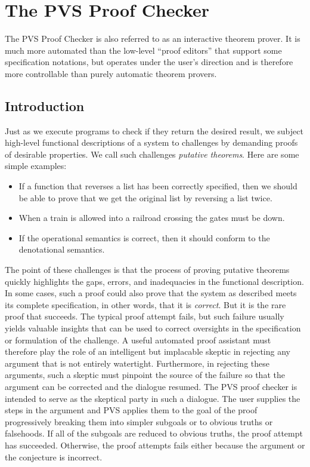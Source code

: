 
\section{The PVS Proof Checker}

The PVS Proof Checker is also referred to as an interactive theorem
prover.  It is much more automated than the low-level ``proof
editors'' that support some specification notations, but operates
under the user's direction and is therefore more controllable than
purely automatic theorem provers.


\subsection{Introduction}

Just as we execute programs to check if they return the desired result,
we subject high-level functional descriptions of a system to challenges
by demanding proofs of desirable properties.  We call such challenges
{\em putative theorems}.  Here are some simple examples:
\begin{itemize}
  \item If a function that reverses a list has been
correctly specified, then we should be able to prove that we get the
original list by reversing a list twice.

  \item When a train is allowed into a railroad crossing the gates must
be down.  

  \item If the operational semantics is correct, then it should conform
to the denotational semantics.
\end{itemize}
%
The point of these challenges is that the process of proving putative
theorems quickly highlights the gaps, errors, and inadequacies in the
functional description.  In some cases, such a proof could also prove
that the system as described meets its complete specification, in other
words, that it is {\em correct\/}.  But it is the rare proof that
succeeds.  The typical proof attempt fails, but such failure usually
yields valuable insights that can be used to correct oversights in the
specification or formulation of the challenge.  A useful automated proof
assistant must therefore play the role of an intelligent but implacable
skeptic in rejecting any argument that is not entirely watertight.
Furthermore, in rejecting these arguments, such a skeptic must pinpoint
the source of the failure so that the argument can be corrected and the
dialogue resumed.  The PVS proof checker is intended to serve as the
skeptical party in such a dialogue.  The user supplies the steps in the
argument and PVS applies them to the goal of the proof progressively
breaking them into simpler subgoals or to obvious truths or falsehoods.
If all of the subgoals are reduced to obvious truths, the proof attempt
has succeeded.  Otherwise, the proof attempts fails either because the
argument or the conjecture is incorrect.

